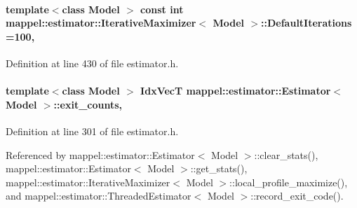 \paragraph[{\texorpdfstring{Default\+Iterations}{DefaultIterations}}]{\setlength{\rightskip}{0pt plus 5cm}template$<$class Model $>$ const int {\bf mappel\+::estimator\+::\+Iterative\+Maximizer}$<$ Model $>$\+::Default\+Iterations =100\hspace{0.3cm}{\ttfamily [static]}, {\ttfamily [inherited]}}\hypertarget{classmappel_1_1estimator_1_1IterativeMaximizer_ab66c01c2eee630f3fca119f3fe09a19a}{}\label{classmappel_1_1estimator_1_1IterativeMaximizer_ab66c01c2eee630f3fca119f3fe09a19a}


Definition at line 430 of file estimator.\+h.

\paragraph[{\texorpdfstring{exit\+\_\+counts}{exit_counts}}]{\setlength{\rightskip}{0pt plus 5cm}template$<$class Model $>$ {\bf Idx\+VecT} {\bf mappel\+::estimator\+::\+Estimator}$<$ Model $>$\+::exit\+\_\+counts\hspace{0.3cm}{\ttfamily [protected]}, {\ttfamily [inherited]}}\hypertarget{classmappel_1_1estimator_1_1Estimator_aa946d9789a1299d684f83a822a10caa7}{}\label{classmappel_1_1estimator_1_1Estimator_aa946d9789a1299d684f83a822a10caa7}


Definition at line 301 of file estimator.\+h.



Referenced by mappel\+::estimator\+::\+Estimator$<$ Model $>$\+::clear\+\_\+stats(), mappel\+::estimator\+::\+Estimator$<$ Model $>$\+::get\+\_\+stats(), mappel\+::estimator\+::\+Iterative\+Maximizer$<$ Model $>$\+::local\+\_\+profile\+\_\+maximize(), and mappel\+::estimator\+::\+Threaded\+Estimator$<$ Model $>$\+::record\+\_\+exit\+\_\+code().

